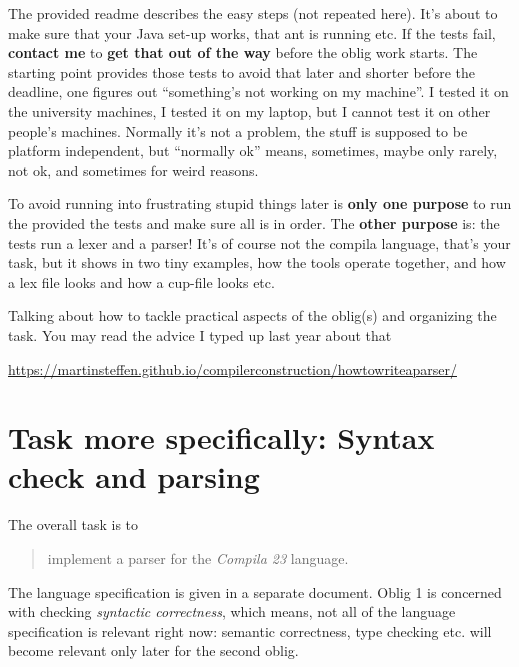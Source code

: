 \documentclass[10pt,freeform]{handout}[2014/08/13]
\begin{document}
The provided readme describes the easy steps (not repeated here). It's
about to make sure that your Java set-up works, that ant is running
etc. If the tests fail, \textbf{contact me} to \textbf{get that out of the
  way} before the oblig work starts. The starting point provides those
tests to avoid that later and shorter before the deadline, one figures out
``something's not working on my machine''. I tested it on the university
machines, I tested it on my laptop, but I cannot test it on other people's
machines.  Normally it's not a problem, the stuff is supposed to be
platform independent, but ``normally ok'' means, sometimes, maybe only
rarely, not ok, and sometimes for weird reasons.

To avoid running into frustrating stupid things later is \textbf{only one
  purpose} to run the provided the tests and make sure all is in order. The
\textbf{other purpose} is: the tests run a lexer and a parser!  It's of
course not the compila language, that's your task, but it shows in two tiny
examples, how the tools operate together, and how a lex file looks and how
a cup-file looks etc.

Talking about how to tackle practical aspects of the oblig(s) and
organizing the task. You may read the advice I typed up last year about that

\begin{center}
  \url{https://martinsteffen.github.io/compilerconstruction/howtowriteaparser/}
\end{center}





\section{Task more specifically: Syntax check and parsing}
\label{sec:task-more-spec}


The overall task is to 

\begin{quote}
  implement a parser for the \textsl{Compila 23} language.
\end{quote}
The language specification is given in a separate document. Oblig 1 is
concerned with checking \emph{syntactic correctness}, which means, not all
of the language specification is relevant right now: semantic correctness,
type checking etc. will become relevant only later for the second oblig.
\end{document}
